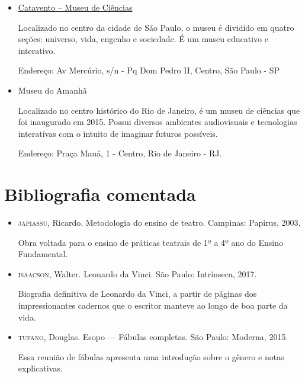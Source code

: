 \documentclass[11pt]{extarticle}
\begin{document}
\begin{itemize}

\item \href{https://museucatavento.org.br/}{Catavento – Museu de Ciências}

Localizado no centro da cidade de São Paulo, o museu é dividido em quatro seções: universo, vida, engenho e sociedade. É um museu educativo e interativo.

Endereço: Av Mercúrio, s/n - Pq Dom Pedro II, Centro, São Paulo - SP

\item {Museu do Amanhã}

Localizado no centro histórico do Rio de Janeiro, é um museu de ciências que foi inaugurado em 2015. Possui diversos ambientes audiovisuais e tecnologias interativas com o intuito de imaginar futuros possíveis.

Endereço: Praça Mauá, 1 - Centro, Rio de Janeiro - RJ.

\end{itemize}

\section{Bibliografia comentada}

\begin{itemize}

\item \textsc{japiassu}, Ricardo. Metodologia do ensino de teatro. Campinas: Papirus, 2003.

Obra voltada para o ensino de práticas teatrais de 1º a 4º ano do Ensino Fundamental.

\item \textsc{isaacson}, Walter. Leonardo da Vinci. São Paulo: Intrínseca, 2017.

Biografia definitiva de Leonardo da Vinci, a partir de páginas dos impressionantes cadernos que o escritor manteve ao longo de boa parte da vida.

\item \textsc{tufano}, Douglas. Esopo --- Fábulas completas. São Paulo: Moderna, 2015.
 
Essa reunião de fábulas apresenta uma introdução sobre o gênero e notas explicativas.

\end{itemize}
\end{document}
